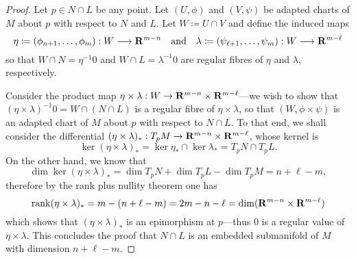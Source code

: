 \begin{proof}
Let \(p \in N \cap L\) be any point. Let \((U, \phi)\) and \((V, \psi)\) be
adapted charts of \(M\) about \(p\) with respect to \(N\) and \(L\). Let
\(W \coloneq U \cap V\) and define the induced maps
\[
\eta \coloneq (\phi_{n+1}, \dots, \phi_m): W \longrightarrow \mathbf{R}^{m-n}
\quad \text{and} \quad
\lambda \coloneq (\psi_{\ell+1}, \dots, \psi_m): W \longrightarrow \mathbf{R}^{m-\ell}
\]
so that \(W \cap N = \eta^{-1} 0\) and \(W \cap L = \lambda^{-1} 0\) are regular
fibres of \(\eta\) and \(\lambda\), respectively.

Consider the product map
\(\eta \times \lambda: W \to \mathbf{R}^{m-n} \times \mathbf{R}^{m-\ell}\)---we wish to show
that \((\eta \times \lambda)^{-1} 0 = W \cap (N \cap L)\) is a regular fibre of
\(\eta \times \lambda\), so that \((W, \phi \times \psi)\) is an adapted chart
of \(M\) about \(p\) with respect to \(N \cap L\). To that end, we shall
consider the differential
\((\eta \times \lambda)_{*}: T_p M \to \mathbf{R}^{m - n} \times \mathbf{R}^{m - \ell}\), whose
kernel is
\[
\ker(\eta \times \lambda)_{*} = \ker \eta_{*} \cap \ker \lambda_{*}
= T_p N \cap T_p L.
\]
On the other hand, we know that
\[
\dim \ker(\eta \times \lambda)_{*}
= \dim T_p N + \dim T_p L - \dim T_p M
= n + \ell - m,
\]
therefore by the rank plus nullity theorem one has
\[
\operatorname{rank}(\eta \times \lambda)_{*} = m - (n + \ell - m) = 2 m - n - \ell
= \dim (\mathbf{R}^{m-n} \times \mathbf{R}^{m-\ell})
\]
which shows that \((\eta \times \lambda)_{*}\) is an epimorphism at \(p\)---thus
\(0\) is a regular value of \(\eta \times \lambda\). This concludes the proof
that \(N \cap L\) is an embedded submanifold of \(M\) with dimension
\(n + \ell - m\).

\end{proof}



